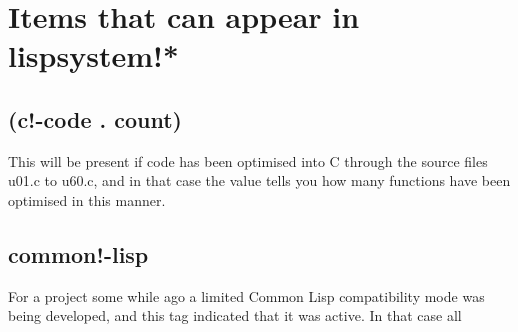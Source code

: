 \documentclass[a4paper,11pt]{article}
\begin{document}
\section{Items that can appear in {\ttfamily lispsystem!*}}

\subsection{\ttfamily (c!-code . count)}
   This will be present if code has been optimised into C through the source
   files u01.c to u60.c, and in that case the value tells you how many functions
   have been optimised in this manner.
  

\subsection{\ttfamily common!-lisp}
   For a project some while ago a limited Common Lisp compatibility mode was
   being developed, and this tag indicated that it was active. In that case all
\end{document}
